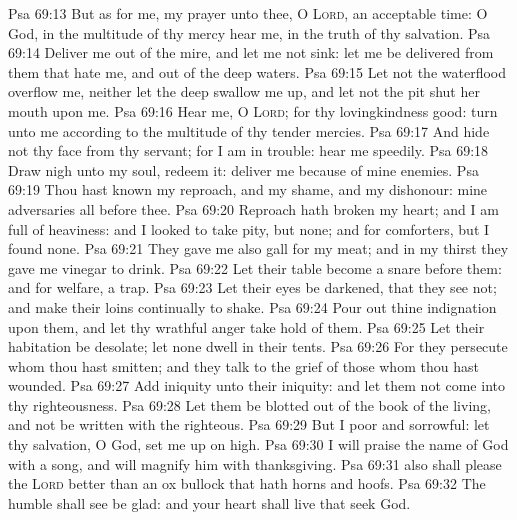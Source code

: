 \vs Psa 69:13 But as for me, my prayer  unto thee, O \textsc{Lord},  an acceptable time: O God, in the multitude of thy mercy hear me, in the truth of thy salvation.
\vs Psa 69:14 Deliver me out of the mire, and let me not sink: let me be delivered from them that hate me, and out of the deep waters.
\vs Psa 69:15 Let not the waterflood overflow me, neither let the deep swallow me up, and let not the pit shut her mouth upon me.
\vs Psa 69:16 Hear me, O \textsc{Lord}; for thy lovingkindness  good: turn unto me according to the multitude of thy tender mercies.
\vs Psa 69:17 And hide not thy face from thy servant; for I am in trouble: hear me speedily.
\vs Psa 69:18 Draw nigh unto my soul,  redeem it: deliver me because of mine enemies.
\vs Psa 69:19 Thou hast known my reproach, and my shame, and my dishonour: mine adversaries  all before thee.
\vs Psa 69:20 Reproach hath broken my heart; and I am full of heaviness: and I looked  to take pity, but  none; and for comforters, but I found none.
\vs Psa 69:21 They gave me also gall for my meat; and in my thirst they gave me vinegar to drink.
\vs Psa 69:22 Let their table become a snare before them: and  for  welfare,  a trap.
\vs Psa 69:23 Let their eyes be darkened, that they see not; and make their loins continually to shake.
\vs Psa 69:24 Pour out thine indignation upon them, and let thy wrathful anger take hold of them.
\vs Psa 69:25 Let their habitation be desolate;  let none dwell in their tents.
\vs Psa 69:26 For they persecute  whom thou hast smitten; and they talk to the grief of those whom thou hast wounded.
\vs Psa 69:27 Add iniquity unto their iniquity: and let them not come into thy righteousness.
\vs Psa 69:28 Let them be blotted out of the book of the living, and not be written with the righteous.
\vs Psa 69:29 But I  poor and sorrowful: let thy salvation, O God, set me up on high.
\vs Psa 69:30 I will praise the name of God with a song, and will magnify him with thanksgiving.
\vs Psa 69:31  also shall please the \textsc{Lord} better than an ox  bullock that hath horns and hoofs.
\vs Psa 69:32 The humble shall see  be glad: and your heart shall live that seek God.

